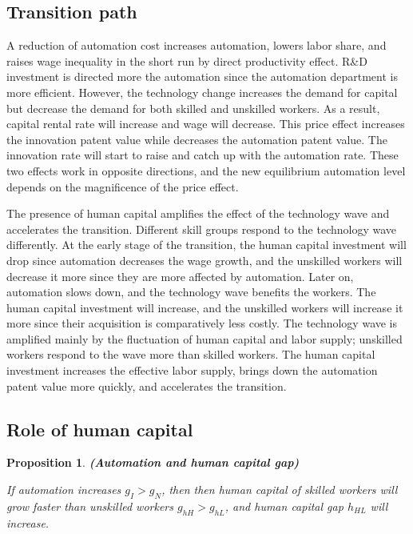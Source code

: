\documentclass[12pt]{article}
\newtheorem{proposition}{Proposition}
\begin{document}
\subsection{Transition path}

A reduction of automation cost increases automation, lowers labor share, and raises wage inequality in the short run by direct productivity effect. R\&D investment is directed more the automation since the automation department is more efficient. However, the technology change increases the demand for capital but decrease the demand for both skilled and unskilled workers. As a result, capital rental rate will increase and wage will decrease. This price effect increases the innovation patent value while decreases the automation patent value. The innovation rate will start to raise and catch up with the automation rate. These two effects work in opposite directions, and the new equilibrium automation level depends on the magnificence of the price effect. 

The presence of human capital amplifies the effect of the technology wave and accelerates the transition. Different skill groups respond to the technology wave differently. At the early stage of the transition, the human capital investment will drop since automation decreases the wage growth, and the unskilled workers will decrease it more since they are more affected by automation. Later on, automation slows down, and the technology wave benefits the workers. The human capital investment will increase, and the unskilled workers will increase it more since their acquisition is comparatively less costly. The technology wave is amplified mainly by the fluctuation of human capital and labor supply; unskilled workers respond to the wave more than skilled workers. The human capital investment increases the effective labor supply, brings down the automation patent value more quickly, and accelerates the transition. 


\subsection{Role of human capital}

\begin{proposition}{\bf (Automation and human capital gap)} 

If automation increases $g_I>g_N$, then then human capital of skilled workers will grow faster than unskilled workers $g_{hH}>g_{hL}$, and human capital gap $h_{HL}$ will increase. 
\end{proposition}
\end{document}
